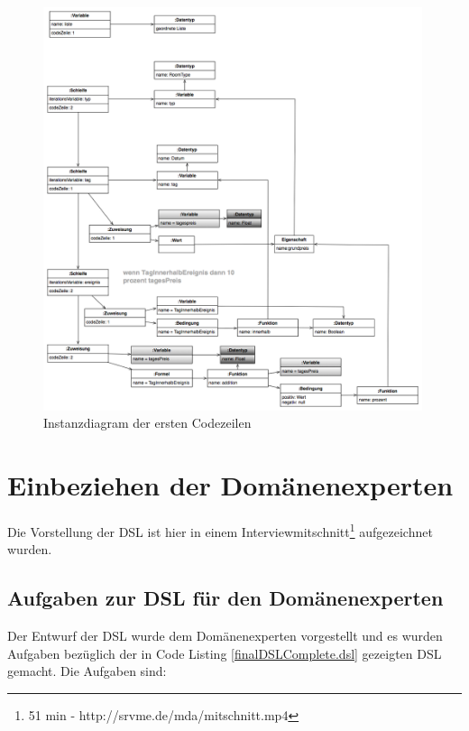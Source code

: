 \documentclass[11pt,english,ngerman, headsepline]{scrreprt}
\begin{document}
\begin{figure}[h!]
	\begin{center}
	\includegraphics[width=0.99\textwidth]{pics/mmInstanz}
	\end{center}
	\caption{Instanzdiagram der ersten Codezeilen}
	\label{mmInstanz.png}
\end{figure}
 \clearpage
 
\chapter{Einbeziehen der Domänenexperten}

Die Vorstellung der DSL ist hier in einem Interviewmitschnitt\footnote{51 min -
http://srvme.de/mda/mitschnitt.mp4} aufgezeichnet wurden.


\section{Aufgaben zur DSL für den Domänenexperten}

Der Entwurf der DSL wurde dem Domänenexperten vorgestellt und es wurden
Aufgaben bezüglich der in Code Listing \ref{finalDSLComplete.dsl} gezeigten DSL gemacht.
Die Aufgaben sind:
\end{document}
